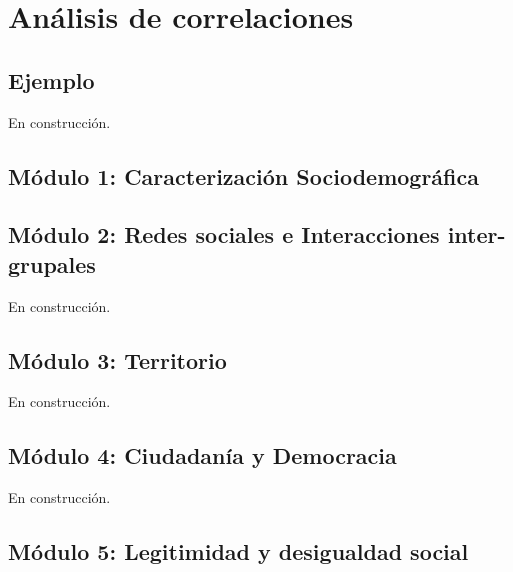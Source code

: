 \documentclass[
  12pt,
]{book}
\begin{document}
\hypertarget{anuxe1lisis-de-correlaciones-1}{%
\chapter{Análisis de correlaciones}\label{anuxe1lisis-de-correlaciones-1}}

\hypertarget{ejemplo}{%
\section{Ejemplo}\label{ejemplo}}

En construcción.

\hypertarget{muxf3dulo-1-caracterizaciuxf3n-sociodemogruxe1fica}{%
\section{Módulo 1: Caracterización Sociodemográfica}\label{muxf3dulo-1-caracterizaciuxf3n-sociodemogruxe1fica}}

\hypertarget{muxf3dulo-2-redes-sociales-e-interacciones-inter-grupales}{%
\section{Módulo 2: Redes sociales e Interacciones inter-grupales}\label{muxf3dulo-2-redes-sociales-e-interacciones-inter-grupales}}

En construcción.

\hypertarget{muxf3dulo-3-territorio}{%
\section{Módulo 3: Territorio}\label{muxf3dulo-3-territorio}}

En construcción.

\hypertarget{muxf3dulo-4-ciudadanuxeda-y-democracia}{%
\section{Módulo 4: Ciudadanía y Democracia}\label{muxf3dulo-4-ciudadanuxeda-y-democracia}}

En construcción.

\hypertarget{muxf3dulo-5-legitimidad-y-desigualdad-social}{%
\section{Módulo 5: Legitimidad y desigualdad social}\label{muxf3dulo-5-legitimidad-y-desigualdad-social}}
\end{document}
